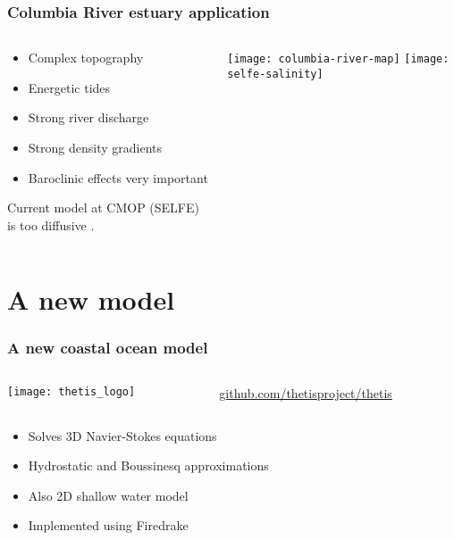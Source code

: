 \documentclass{beamer}
\begin{document}
\begin{frame}[t]
  \frametitle{Columbia River estuary application}
  \begin{columns}[t]
  \begin{column}{0.5\textwidth}
    \begin{itemize}
    \item Complex topography
    \item Energetic tides
    \item Strong river discharge
    \item Strong density gradients
    \item Baroclinic effects very important
    \end{itemize}
    Current model at CMOP (SELFE) is too diffusive \parencite{Karna:2015}.
  \end{column}
  \hspace*{-2em}
  \begin{column}{0.6\textwidth}
    \begin{center}
      \vspace{-2em}
      \texttt{[image: columbia-river-map]}
      \vspace{1em}
      \texttt{[image: selfe-salinity]}
    \end{center}
  \end{column}
\end{columns}
\end{frame}


\section{A new model}

\begin{frame}
\frametitle{A new coastal ocean model}
\begin{columns}
  \begin{column}{0.25\textwidth}
    \texttt{[image: thetis\_logo]}
  \end{column}
  \begin{column}{0.75\textwidth} {\small
      \url{github.com/thetisproject/thetis}}
  \end{column}
\end{columns}
\begin{columns}
  \begin{column}{0.9\textwidth}
    \begin{itemize}
    \item Solves 3D Navier-Stokes equations
    \item Hydrostatic and Boussinesq approximations
    \item Also 2D shallow water model
    \item Implemented using Firedrake
    \end{itemize}
  \end{column}
\end{columns}
\end{frame}
\end{document}
